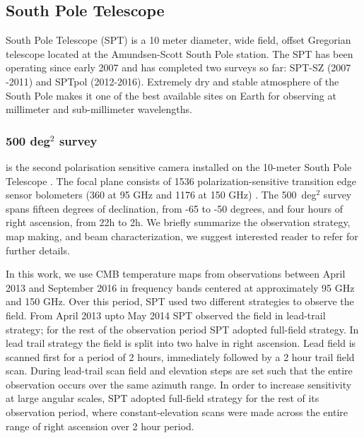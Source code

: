 \subsection{South Pole Telescope}
\label{sec_SPT}
South Pole Telescope (SPT) is a 10 meter diameter, wide field, offset Gregorian telescope \citep[SPT,][]{ carlstrom11,padin08} located at the Amundsen-Scott South Pole station.
The SPT has been operating since early 2007 and has completed two surveys so far: SPT-SZ (2007 -2011) and SPTpol (2012-2016).  
Extremely dry and stable atmosphere of the South Pole makes it one of the best available sites on Earth for observing at millimeter and sub-millimeter wavelengths. 

\subsubsection*{\sptpol{} {\rm 500} deg$^{2}$ survey}\label{sec_sptpol}
\sptpol{} is the second polarisation sensitive camera installed on the \mbox{10-meter} South Pole Telescope \citep[SPT,][]{padin08, carlstrom11}.
The \sptpol{} focal plane consists of 1536 polarization-sensitive transition edge sensor bolometers (360 at 95 GHz and 1176 at 150 GHz) \citep{austermann12}.
The \sptpol{} 500~deg$^{2}$ survey spans fifteen degrees of declination, from -65 to -50 degrees, and four hours of right ascension, from 22h to 2h. 
We briefly summarize the observation strategy, map making, and beam characterization, we suggest interested reader to refer \cite{henning18} for further details. 

In this work, we use CMB temperature maps from observations between April 2013 and September 2016 in frequency bands centered at approximately 95 GHz and 150 GHz.  Over this period, SPT used two different strategies to observe the field. From April 2013 upto May 2014 SPT observed the field in lead-trail strategy; for the rest of the observation period SPT adopted full-field strategy. In lead trail strategy the field is split into two halve in right ascension. Lead field is scanned first for a period of 2 hours, immediately followed by a 2 hour trail field scan.  During lead-trail scan field and elevation steps are set such that the entire observation occurs over the same azimuth range. In order to increase sensitivity at large angular scales, SPT adopted full-field strategy for the rest of its observation period, where constant-elevation scans were made across the entire range of right ascension over 2 hour period.


